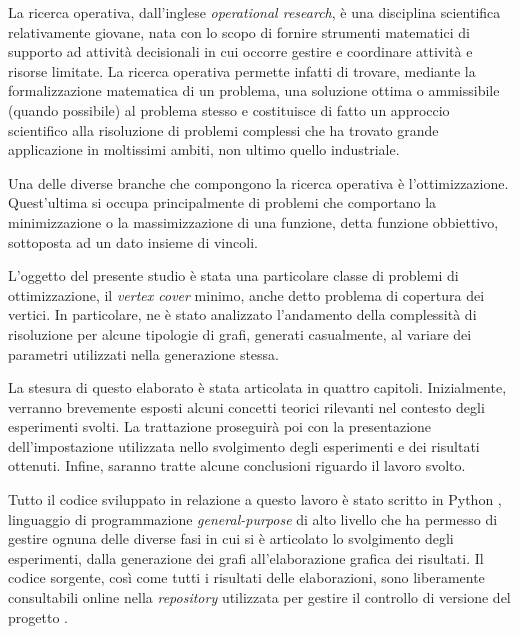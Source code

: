 La ricerca operativa, dall'inglese \textit{operational research}, è una disciplina scientifica relativamente 
giovane, nata con lo scopo di fornire strumenti matematici di supporto ad attività decisionali in cui occorre gestire e coordinare 
attività e risorse limitate. La ricerca operativa permette infatti di trovare, mediante la formalizzazione 
matematica di un problema, una soluzione ottima o ammissibile (quando possibile) al problema stesso e costituisce di fatto un approccio scientifico alla risoluzione di problemi 
complessi che ha trovato grande applicazione in moltissimi ambiti, non ultimo quello industriale. 

Una delle diverse branche che compongono la ricerca operativa è l'ottimizzazione. 
Quest'ultima si occupa principalmente di problemi che comportano la minimizzazione o la massimizzazione di una funzione, detta funzione
obbiettivo, sottoposta ad un dato insieme di vincoli. 

L'oggetto del presente studio è stata una particolare classe di problemi di ottimizzazione, il \textit{vertex cover} minimo, anche detto problema di copertura dei vertici. In particolare, ne è stato analizzato l'andamento della complessità di risoluzione per alcune tipologie di grafi, generati casualmente, al variare dei parametri utilizzati nella generazione stessa.

La stesura di questo elaborato è stata articolata in quattro capitoli. Inizialmente, verranno brevemente esposti alcuni concetti teorici rilevanti nel contesto degli 
esperimenti svolti. La trattazione proseguirà poi con la presentazione dell'impostazione utilizzata nello svolgimento degli
esperimenti e dei risultati ottenuti. Infine, saranno tratte alcune conclusioni riguardo il lavoro svolto. 

Tutto il codice sviluppato in relazione a questo lavoro è stato scritto in Python \cite{python}, linguaggio di programmazione \textit{general-purpose} di alto livello che ha permesso di gestire ognuna delle diverse fasi in cui si è articolato lo svolgimento degli esperimenti, dalla generazione dei grafi all'elaborazione grafica dei risultati. Il codice sorgente, così come tutti i risultati delle elaborazioni, sono liberamente consultabili online nella \textit{repository} utilizzata per gestire il controllo di versione del progetto \cite{repository}.